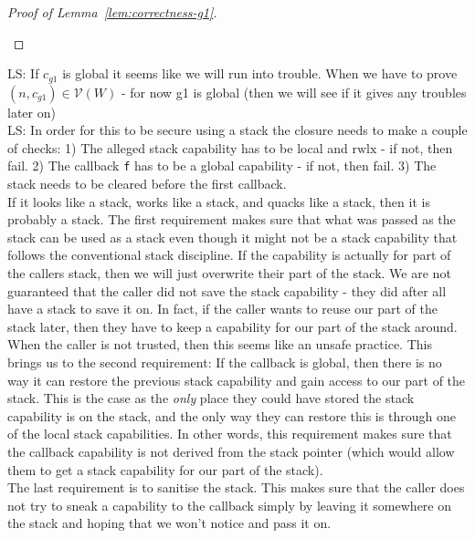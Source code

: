\documentclass[a4paper]{article}
\newcommand\lau[1]{{\color{purple} \sf \footnotesize {LS: #1}}\\}
\newcommand{\asmType}{\plaindom{AsmType}}
\newcommand{\plaindom}[1]{\mathrm{#1}}
\newcommand{\intr}[2]{\mathcal{#1}}
\newcommand{\valueintr}[1]{\intr{V}{#1}}
\newcommand{\stdvr}{\valueintr{\asmType}}
\newcommand{\npair}[2][n]{\left(#1,#2 \right)}
\newcommand{\plainperm}[1]{\mathrm{#1}}
\newcommand{\rwlx}{\plainperm{rwlx}}
\begin{document}
\begin{lemma}
\begin{proof}[Proof of Lemma~\ref{lem:correctness-g1}]
\begin{enumproof}
\begin{enumproof}
\begin{enumproof}
\begin{enumproof}
        \end{enumproof}
      \end{enumproof}
    \end{enumproof}
  \end{enumproof}
\end{proof}

\lau{If $c_{g1}$ is global it seems like we will run into trouble. When we have to prove $\npair{c_{g1}} \in \stdvr(W)$ - for now g1 is global (then we will see if it gives any troubles later on)}



\lau{In order for this to be secure using a stack the closure needs to make a couple of checks: 1) The alleged stack capability has to be local and $\rwlx$ - if not, then fail. 2) The callback \texttt{f} has to be a global capability - if not, then fail. 3) The stack needs to be cleared before the first callback. \\If it looks like a stack, works like a stack, and quacks like a stack, then it is probably a stack. The first requirement makes sure that what was passed as the stack can be used as a stack even though it might not be a stack capability that follows the conventional stack discipline. If the capability is actually for part of the callers stack, then we will just overwrite their part of the stack. We are not guaranteed that the caller did not save the stack capability - they did after all have a stack to save it on. In fact, if the caller wants to reuse our part of the stack later, then they have to keep a capability for our part of the stack around. When the caller is not trusted, then this seems like an unsafe practice. This brings us to the second requirement: If the callback is global, then there is no way it can restore the previous stack capability and gain access to our part of the stack. This is the case as the \emph{only} place they could have stored the stack capability is on the stack, and the only way they can restore this is through one of the local stack capabilities. In other words, this requirement makes sure that the callback capability is not derived from the stack pointer (which would allow them to get a stack capability for our part of the stack).\\ The last requirement is to sanitise the stack. This makes sure that the caller does not try to sneak a capability to the callback simply by leaving it somewhere on the stack and hoping that we won't notice and pass it on. }




\end{lemma}
\end{document}
